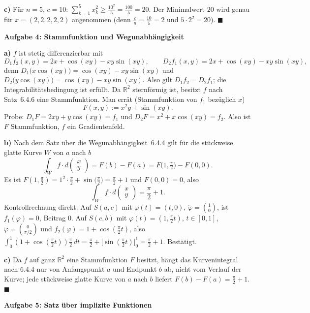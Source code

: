 \documentclass[a4paper,12pt]{article}
\providecommand{\qed}{\hfill\ensuremath{\blacksquare}}
\newcommand{\aufgabe}[2]{%
  \bigskip\par\noindent\textbf{Aufgabe #1: #2}\par\nobreak\medskip}
\begin{document}
\textbf{c)} Für $n=5$, $c=10$: $\displaystyle \sum_{k=1}^5 x_k^2 \ge \frac{10^2}{5}=\frac{100}{5}=20.$ Der Minimalwert $20$ wird genau für $x=(2,2,2,2,2)$ angenommen (denn $\tfrac{c}{n}=\tfrac{10}{5}=2$ und $5\cdot 2^2=20$). \qed

\aufgabe{4}{Stammfunktion und Wegunabhängigkeit}

\textbf{a)} $f$ ist stetig differenzierbar mit
\[ D_1 f_2(x,y)=2x+\cos(xy)-xy\sin(xy),\qquad D_2 f_1(x,y)=2x+\cos(xy)-xy\sin(xy), \]
denn $D_1\big(x\cos(xy)\big)=\cos(xy)-xy\sin(xy)$ und $D_2\big(y\cos(xy)\big)=\cos(xy)-xy\sin(xy)$. Also gilt $D_1 f_2=D_2 f_1$; die Integrabilitätsbedingung ist erfüllt. Da $\mathbb{R}^2$ sternförmig ist, besitzt $f$ nach Satz~6.4.6 eine Stammfunktion. Man errät (Stammfunktion von $f_1$ bezüglich $x$)
\[ F(x,y):=x^{2}y+\sin(xy). \]
Probe: $D_1 F=2xy+y\cos(xy)=f_1$ und $D_2 F=x^{2}+x\cos(xy)=f_2$. Also ist $F$ Stammfunktion, $f$ ein Gradientenfeld.

\textbf{b)} Nach dem Satz über die Wegunabhängigkeit~6.4.4 gilt für die stückweise glatte Kurve $W$ von $a$ nach $b$
\[ \int_W f\cdot d\!\begin{pmatrix}x\\y\end{pmatrix}=F(b)-F(a)=F\!\Big(1,\tfrac{\pi}{2}\Big)-F(0,0). \]
Es ist $F(1,\tfrac{\pi}{2})=1^{2}\cdot\tfrac{\pi}{2}+\sin\!\big(\tfrac{\pi}{2}\big)=\tfrac{\pi}{2}+1$ und $F(0,0)=0$, also
\[ \int_W f\cdot d\!\begin{pmatrix}x\\y\end{pmatrix}=\frac{\pi}{2}+1. \]
Kontrollrechnung direkt: Auf $S(a,c)$ mit $\varphi(t)=(t,0)$, $\dot\varphi=\binom10$, ist $f_1(\varphi)=0$, Beitrag $0$. Auf $S(c,b)$ mit $\varphi(t)=(1,\tfrac{\pi}{2}t)$, $t\in[0,1]$, $\dot\varphi=\binom{0}{\pi/2}$ und $f_2(\varphi)=1+\cos(\tfrac{\pi}{2}t)$, also $\int_0^1(1+\cos(\tfrac{\pi}{2}t))\tfrac{\pi}{2}\,dt=\tfrac{\pi}{2}+\big[\sin(\tfrac{\pi}{2}t)\big]_0^1=\tfrac{\pi}{2}+1$. Bestätigt.

\textbf{c)} Da $f$ auf ganz $\mathbb{R}^2$ eine Stammfunktion $F$ besitzt, hängt das Kurvenintegral nach 6.4.4 nur von Anfangspunkt $a$ und Endpunkt $b$ ab, nicht vom Verlauf der Kurve; jede stückweise glatte Kurve von $a$ nach $b$ liefert $F(b)-F(a)=\tfrac{\pi}{2}+1$. \qed

\aufgabe{5}{Satz über implizite Funktionen}
\end{document}

